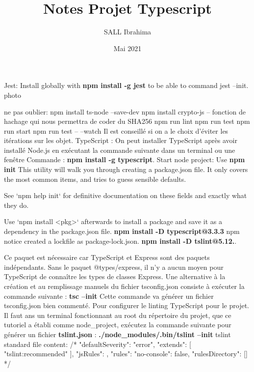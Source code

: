 \documentclass[table]{article}
\title{Notes Projet Typescript}
\author{SALL Ibrahima}
\date{Mai 2021}
\begin{document}



Jest: Install globally with \textbf{npm install -g jest} to be able to command jest --init.
photo

ne pas oublier:     npm install ts-node --save-dev
npm install crypto-js -- fonction de hachage qui nous permettra de coder du SHA256
npm run lint
npm run test 
npm run start
npm run test -- --watch
\newline Il est conseillé si on a le choix d'éviter les itérations sur les objet.
\newline TypeScript : On peut installer TypeScript après avoir installé Node.js en exécutant la commande suivante dans un terminal ou une fenêtre Commande : \textbf{npm install -g typescript}.
\newline Start node project: Use \textbf{npm init} 
This utility will walk you through creating a package.json file.
It only covers the most common items, and tries to guess sensible defaults.

See `npm help init` for definitive documentation on these fields
and exactly what they do.

Use `npm install <pkg>` afterwards to install a package and
save it as a dependency in the package.json file. 
\newline \textbf{npm install -D typescript@3.3.3} npm notice created a lockfile as package-lock.json.
\newline \textbf{npm install -D tslint@5.12.}.

\newline Ce paquet est nécessaire car TypeScript et Express sont des paquets indépendants. Sans le paquet @types/express, il n'y a aucun moyen pour TypeScript de connaître les types de classes Express.
\newline Une alternative à la création et au remplissage manuels du fichier tsconfig.json consiste à exécuter la commande suivante :
\textbf{tsc --init} Cette commande va générer un fichier tsconfig.json bien commenté.
\newline Pour configurer le linting TypeScript pour le projet. Il faut ans un terminal fonctionnant au root du répertoire du projet, que ce tutoriel a établi comme node_project, exécutez la commande suivante pour générer un fichier \textbf{tslint.json} :
\textbf{./node_modules/.bin/tslint --init}
\newline tslint standard file content: /*{
    "defaultSeverity": "error",
    "extends": [
        "tslint:recommended"
    ],
    "jsRules": {},
    "rules": {"no-console": false},
    "rulesDirectory": []
}*/
\end{document}
